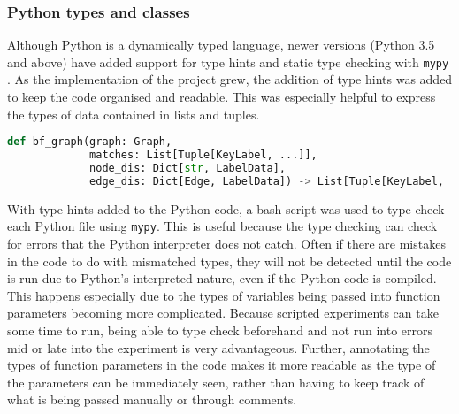\subsubsection{Python types and classes}
Although Python is a dynamically typed language, newer versions (Python 3.5 and above) have added support for type hints and static type checking with \texttt{mypy} \cite{mypy}. As the implementation of the project grew, the addition of type hints was added to keep the code organised and readable. This was especially helpful to express the types of data contained in lists and tuples.
\begin{lstlisting}[language=Python, caption={Example of a function definition with added type hints. The types from Python's \texttt{typing} class are highlighted here in red.}]
def bf_graph(graph: Graph,
             matches: List[Tuple[KeyLabel, ...]],
             node_dis: Dict[str, LabelData],
             edge_dis: Dict[Edge, LabelData]) -> List[Tuple[KeyLabel, ...]]:
\end{lstlisting}
With type hints added to the Python code, a bash script was used to type check each Python file using \texttt{mypy}. This is useful because the type checking can check for errors that the Python interpreter does not catch. Often if there are mistakes in the code to do with mismatched types, they will not be detected until the code is run due to Python's interpreted nature, even if the Python code is compiled. This happens especially due to the types of variables being passed into function parameters becoming more complicated. Because scripted experiments can take some time to run, being able to type check beforehand and not run into errors mid or late into the experiment is very advantageous. Further, annotating the types of function parameters in the code makes it more readable as the type of the parameters can be immediately seen, rather than having to keep track of what is being passed manually or through comments. 

